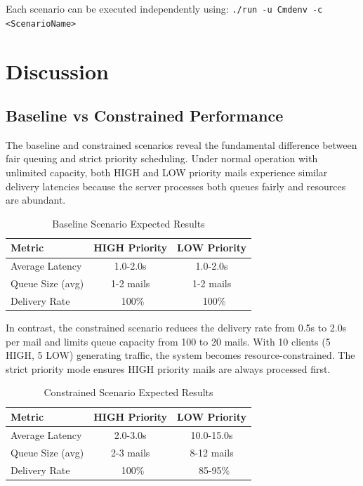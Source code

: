\documentclass[12pt]{article}
\begin{document}
	Each scenario can be executed independently using: \texttt{./run -u Cmdenv -c <ScenarioName>}
	
	\section{Discussion}
	
	\subsection{Baseline vs Constrained Performance}
	
	The baseline and constrained scenarios reveal the fundamental difference between fair queuing and strict priority scheduling. Under normal operation with unlimited capacity, both HIGH and LOW priority mails experience similar delivery latencies because the server processes both queues fairly and resources are abundant.
	
	\begin{table}[H]
		\centering
		\caption{Baseline Scenario Expected Results}
		\label{tab:baseline-results}
		\begin{tabular}{|l|c|c|}
			\hline
			\textbf{Metric} & \textbf{HIGH Priority} & \textbf{LOW Priority} \\
			\hline
			Average Latency & 1.0-2.0s & 1.0-2.0s \\
			Queue Size (avg) & 1-2 mails & 1-2 mails \\
			Delivery Rate & ~100\% & ~100\% \\
			\hline
		\end{tabular}
	\end{table}
	
	In contrast, the constrained scenario reduces the delivery rate from 0.5s to 2.0s per mail and limits queue capacity from 100 to 20 mails. With 10 clients (5 HIGH, 5 LOW) generating traffic, the system becomes resource-constrained. The strict priority mode ensures HIGH priority mails are always processed first.
	
	\begin{table}[H]
		\centering
		\caption{Constrained Scenario Expected Results}
		\label{tab:constrained-results}
		\begin{tabular}{|l|c|c|}
			\hline
			\textbf{Metric} & \textbf{HIGH Priority} & \textbf{LOW Priority} \\
			\hline
			Average Latency & 2.0-3.0s & 10.0-15.0s \\
			Queue Size (avg) & 2-3 mails & 8-12 mails \\
			Delivery Rate & ~100\% & ~85-95\% \\
			\hline
		\end{tabular}
	\end{table}
	
\end{document}
